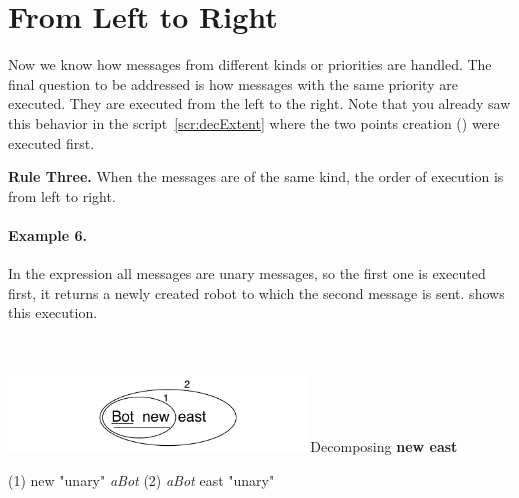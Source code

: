 \section*{From Left to Right}
Now we know how messages from different kinds or priorities are handled. The final question to be addressed is how messages with the same priority are executed. They are executed from the left to the right. Note that you already saw this behavior in the script~\ref{scr:decExtent} where the two points creation () were
executed first.



\begin{largecadre}{\textbf{Rule Three.} When the messages are of the same kind, the order of execution is from left to right.}
\end{largecadre}


\paragraph{Example 6.} In the expression  all messages are unary messages, so the first one  is executed first, it returns a newly created robot to which the second message  is sent.  shows this execution.



\

\begin{decompfigwithsize}[0.5]{\includegraphics[width=8cm]{ucompoUn}}{Decomposing }\label{scr:unaryMessages}
        \textbf{\Turtle new east}
        
  (1)  \Turtle new                 "unary"
      \returns  \emph{aBot}
  (2)         \emph{aBot} east        "unary"
\end{decompfigwithsize}




